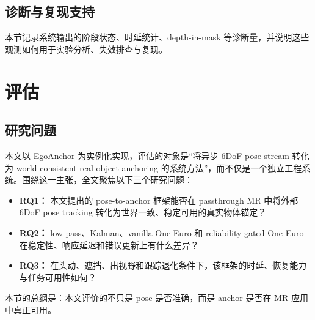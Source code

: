 \documentclass[review]{vgtc}
\begin{document}
\subsection{诊断与复现支持}
本节记录系统输出的阶段状态、时延统计、depth-in-mask 等诊断量，并说明这些观测如何用于实验分析、失效排查与复现。

\section{评估}

\subsection{研究问题}
本文以 EgoAnchor 为实例化实现，评估的对象是“将异步 6DoF pose stream 转化为 world-consistent real-object anchoring 的系统方法”，而不仅是一个独立工程系统。围绕这一主张，全文聚焦以下三个研究问题：
\begin{itemize}
  \item \textbf{RQ1：} 本文提出的 pose-to-anchor 框架能否在 passthrough MR 中将外部 6DoF pose tracking 转化为世界一致、稳定可用的真实物体锚定？
  \item \textbf{RQ2：} low-pass、Kalman、vanilla One Euro 和 reliability-gated One Euro 在稳定性、响应延迟和错误更新上有什么差异？
  \item \textbf{RQ3：} 在头动、遮挡、出视野和跟踪退化条件下，该框架的时延、恢复能力与任务可用性如何？
\end{itemize}
本节的总纲是：本文评价的不只是 pose 是否准确，而是 anchor 是否在 MR 应用中真正可用。
\end{document}
